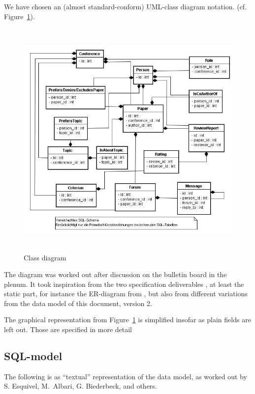 We have chosen an (almost standard-conform) UML-class diagram notation.  (cf.
Figure~\ref{fig:classdiagram}).


\begin{figure}[htbp]
  \centering
  \includegraphics[height=12cm]{../sql/db_schema}
  \caption{Class diagram}
  \label{fig:classdiagram}
\end{figure}

The diagram was worked out after discussion on the bulletin board in the
plenum. It took inspiration from the two specification deliverables
\cite{coma:spec1} \cite{coma:spec2}, at least the static part, for instance
the ER-diagram from \cite{coma:spec1}, but also from different variations
from the data model of this document, version 2.

The graphical representation from Figure~\ref{fig:classdiagram} is
simplified insofar as plain fields are left out. Those are specified in
more detail





\subsection*{SQL-model}
\label{sec:datamodel.sql}
%

The following is as ``textual'' representation of the data model, as worked
out by S. Esquivel, M.\ Albari, G. Biederbeck, and others.


